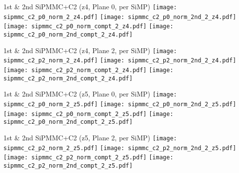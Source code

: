 \documentclass{beamer}
\begin{document}
\begin{frame}{1st \& 2nd SiPMMC+C2 (z4, Plane 0, per SiMP)}
	\texttt{[image: sipmmc\_c2\_p0\_norm\_2\_z4.pdf]}
	\texttt{[image: sipmmc\_c2\_p0\_norm\_2nd\_2\_z4.pdf]} \\
	
		\texttt{[image: sipmmc\_c2\_p0\_norm\_compt\_2\_z4.pdf]}
		\texttt{[image: sipmmc\_c2\_p0\_norm\_2nd\_compt\_2\_z4.pdf]}
\end{frame}

\begin{frame}{1st \& 2nd SiPMMC+C2 (z4, Plane 2, per SiMP)}
	\texttt{[image: sipmmc\_c2\_p2\_norm\_2\_z4.pdf]}
	\texttt{[image: sipmmc\_c2\_p2\_norm\_2nd\_2\_z4.pdf]} \\
	
		\texttt{[image: sipmmc\_c2\_p2\_norm\_compt\_2\_z4.pdf]}
		\texttt{[image: sipmmc\_c2\_p2\_norm\_2nd\_compt\_2\_z4.pdf]}
\end{frame}

\begin{frame}{1st \& 2nd SiPMMC+C2 (z5, Plane 0, per SiMP)}
	\texttt{[image: sipmmc\_c2\_p0\_norm\_2\_z5.pdf]}
	\texttt{[image: sipmmc\_c2\_p0\_norm\_2nd\_2\_z5.pdf]} \\
	
		\texttt{[image: sipmmc\_c2\_p0\_norm\_compt\_2\_z5.pdf]}
		\texttt{[image: sipmmc\_c2\_p0\_norm\_2nd\_compt\_2\_z5.pdf]}
\end{frame}

\begin{frame}{1st \& 2nd SiPMMC+C2 (z5, Plane 2, per SiMP)}
	\texttt{[image: sipmmc\_c2\_p2\_norm\_2\_z5.pdf]}
	\texttt{[image: sipmmc\_c2\_p2\_norm\_2nd\_2\_z5.pdf]} \\
	
	\texttt{[image: sipmmc\_c2\_p2\_norm\_compt\_2\_z5.pdf]}
	\texttt{[image: sipmmc\_c2\_p2\_norm\_2nd\_compt\_2\_z5.pdf]}
\end{frame}


 
\end{document}
